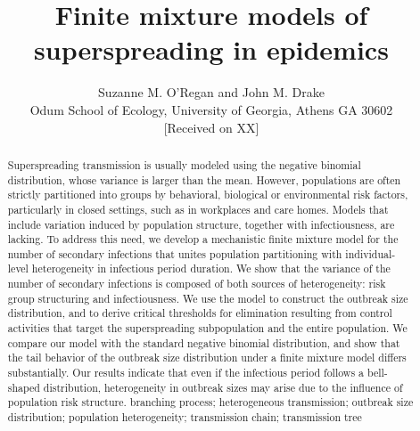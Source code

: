\documentclass{imammb}
\numberwithin{equation}{section}
\begin{document}
\title{Finite mixture models of superspreading in epidemics}
\author{ {\sc Suzanne M. O’Regan and John M. Drake}\\[2pt]
Odum School of Ecology, University of Georgia, Athens GA 30602\\[6pt]
{\rm [Received on XX]}\vspace*{6pt}}
\pagestyle{headings}


\maketitle

\begin{abstract}
{Superspreading transmission is usually modeled using the negative binomial distribution, whose variance is larger than the mean. However, populations are often strictly partitioned into groups by behavioral, biological or environmental risk factors, particularly in closed settings, such as in workplaces and care homes. Models that include variation induced by population structure, together with infectiousness, are lacking. To address this need, we develop a mechanistic finite mixture model for the number of secondary infections that unites population partitioning with individual-level heterogeneity in infectious period duration. We show that the variance of the number of secondary infections is composed of both sources of heterogeneity: risk group structuring and infectiousness. We use the model to construct the outbreak size distribution, and to derive critical thresholds for elimination resulting from control activities that target the superspreading subpopulation and the entire population. We compare our model with the standard negative binomial distribution, and show that the tail behavior of the outbreak size distribution under a finite mixture model differs substantially. Our results indicate that even if the infectious period follows a bell-shaped distribution, heterogeneity in outbreak sizes may arise due to the influence of population risk structure. }
{branching process; heterogeneous transmission; outbreak size distribution; population heterogeneity; transmission chain; transmission tree  }
\end{abstract}
\end{document}
